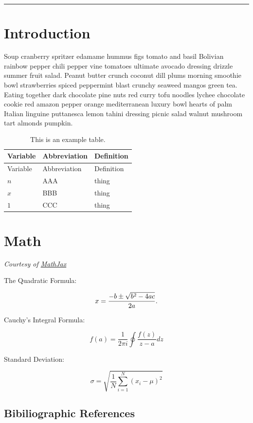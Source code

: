 \documentclass{book}
\begin{document}
\begin{center}\rule{0.5\linewidth}{0.5pt}\end{center}

\hypertarget{introduction}{%
\section{Introduction}\label{introduction}}

Soup cranberry spritzer edamame hummus figs tomato and basil Bolivian rainbow
pepper chili pepper vine tomatoes ultimate avocado dressing drizzle summer
fruit salad. Peanut butter crunch coconut dill plums morning smoothie bowl
strawberries spiced peppermint blast crunchy seaweed mangos green tea. Eating
together dark chocolate pine nuts red curry tofu noodles lychee chocolate
cookie red amazon pepper orange mediterranean luxury bowl hearts of palm
Italian linguine puttanesca lemon tahini dressing picnic salad walnut mushroom
tart almonds pumpkin.

\hypertarget{tbl:variables}{}
\begin{longtable}[]{@{}lll@{}}
\caption{\label{tbl:variables}This is an example table.}\tabularnewline
\toprule
Variable & Abbreviation & Definition \\
\midrule
\endfirsthead
\toprule
Variable & Abbreviation & Definition \\
\midrule
\endhead
\(n\) & AAA & thing \\
\(x\) & BBB & thing \\
\(1\) & CCC & thing \\
\bottomrule
\end{longtable}

\hypertarget{math}{%
\section{Math}\label{math}}

\emph{Courtesy of \href{https://www.mathjax.org/\#samples}{MathJax}}

The Quadratic Formula:

\[x = {-b \pm \sqrt{b^2-4ac} \over 2a}.\]

Cauchy's Integral Formula:

\[f(a) = \frac{1}{2\pi i} \oint\frac{f(z)}{z-a}dz\]

Standard Deviation:

\[\sigma = \sqrt{ \frac{1}{N} \sum_{i=1}^N (x_i -\mu)^2}\]

\hypertarget{bibiliographic-references}{%
\subsection{Bibiliographic References}\label{bibiliographic-references}}
\end{document}
